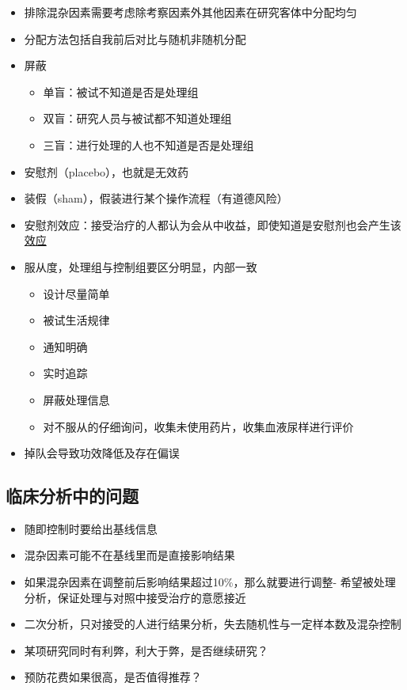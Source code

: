 \documentclass[
]{book}
\providecommand{\tightlist}{%
  \setlength{\itemsep}{0pt}\setlength{\parskip}{0pt}}
\begin{document}
\begin{itemize}
\tightlist
\item
  排除混杂因素需要考虑除考察因素外其他因素在研究客体中分配均匀
\item
  分配方法包括自我前后对比与随机非随机分配
\item
  屏蔽

  \begin{itemize}
  \tightlist
  \item
    单盲：被试不知道是否是处理组
  \item
    双盲：研究人员与被试都不知道处理组
  \item
    三盲：进行处理的人也不知道是否是处理组
  \end{itemize}
\item
  安慰剂（placebo），也就是无效药
\item
  装假（sham），假装进行某个操作流程（有道德风险）
\item
  安慰剂效应：接受治疗的人都认为会从中收益，即使知道是安慰剂也会产生该\href{http://journals.plos.org/plosone/article?id=10.1371/journal.pone.0015591}{效应}
\item
  服从度，处理组与控制组要区分明显，内部一致

  \begin{itemize}
  \tightlist
  \item
    设计尽量简单
  \item
    被试生活规律
  \item
    通知明确
  \item
    实时追踪
  \item
    屏蔽处理信息
  \item
    对不服从的仔细询问，收集未使用药片，收集血液尿样进行评价
  \end{itemize}
\item
  掉队会导致功效降低及存在偏误
\end{itemize}

\hypertarget{ux4e34ux5e8aux5206ux6790ux4e2dux7684ux95eeux9898}{%
\subsection{临床分析中的问题}\label{ux4e34ux5e8aux5206ux6790ux4e2dux7684ux95eeux9898}}

\begin{itemize}
\tightlist
\item
  随即控制时要给出基线信息
\item
  混杂因素可能不在基线里而是直接影响结果
\item
  如果混杂因素在调整前后影响结果超过10\%，那么就要进行调整- 希望被处理分析，保证处理与对照中接受治疗的意愿接近
\item
  二次分析，只对接受的人进行结果分析，失去随机性与一定样本数及混杂控制
\item
  某项研究同时有利弊，利大于弊，是否继续研究？
\item
  预防花费如果很高，是否值得推荐？
\end{itemize}
\end{document}
